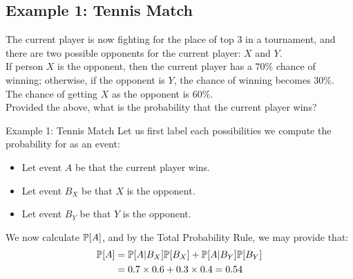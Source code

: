 \subsection{Example 1: Tennis Match}
The current player is now fighting for the place of top 3 in a tournament, and there are two possible opponents for the current player: $X$ and $Y$. \\
If person $X$ is the opponent, then the current player has a $70\%$ chance of winning; otherwise, if the opponent is $Y$, the chance of winning becomes $30\%$. \\
The chance of getting $X$ as the opponent is $60\%$. \\
Provided the above, what is the probability that the current player wins?
\begin{ln-quest}{Example 1: Tennis Match}{}
    Let us first label each possibilities we compute the probability for as an event:
    \begin{itemize}
        \item Let event $A$ be that the current player wins.
        \item Let event $B_X$ be that $X$ is the opponent.
        \item Let event $B_Y$ be that $Y$ is the opponent.
    \end{itemize}
    We now calculate $\P[A]$, and by the Total Probability Rule, we may provide that:
    \begin{align*}
        \P[A] &= \P[A|B_X] \P[B_X] + \P[A|B_Y] \P[B_Y] \\
        &= 0.7 \times 0.6 + 0.3 \times 0.4 = 0.54
    \end{align*}
\end{ln-quest}

